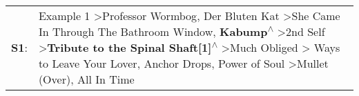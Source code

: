\begin{supertabular}{p{0.03\textwidth}p{0.92\textwidth}}
 \textbf{S1}:  &  Example 1\textsuperscript{} \textgreater \enspace Professor Wormbog\textsuperscript{}, \enspace Der Bluten Kat\textsuperscript{} \textgreater \enspace She Came In Through The Bathroom Window\textsuperscript{}, \enspace \textbf{Kabump\textsuperscript{$\wedge$}} \textgreater \enspace 2nd Self\textsuperscript{} \textgreater \enspace \textbf{Tribute to the Spinal Shaft[1]\textsuperscript{$\wedge$}} \textgreater \enspace Much Obliged\textsuperscript{} \textgreater {} Ways to Leave Your Lover\textsuperscript{}, \enspace Anchor Drops\textsuperscript{}, \enspace Power of Soul\textsuperscript{} \textgreater \enspace Mullet (Over)\textsuperscript{}, \enspace All In Time\textsuperscript{}  \enspace  \\
\end{supertabular}
